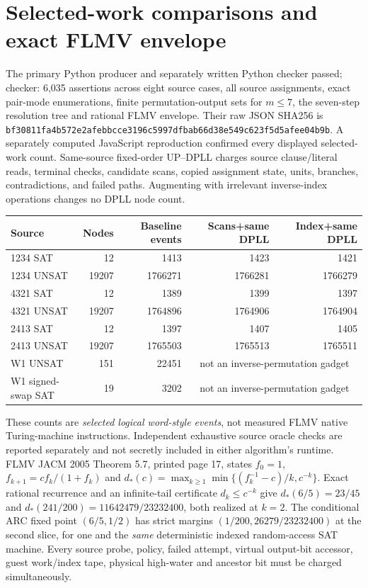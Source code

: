 \documentclass[10pt]{article}
\begin{document}
\section{Selected-work comparisons and exact FLMV envelope}
The primary Python producer and separately written Python checker passed; checker: 6,035 assertions across eight source cases, all source assignments, exact pair-mode enumerations, finite permutation-output sets for $m\le7$, the seven-step resolution tree and rational FLMV envelope. Their raw JSON SHA256 is \texttt{bf30811fa4b572e2afebbcce3196c5997dfbab66d38e549c623f5d5afee04b9b}. A separately computed JavaScript reproduction confirmed every displayed selected-work count. Same-source fixed-order UP--DPLL charges source clause/literal reads, terminal checks, candidate scans, copied assignment state, units, branches, contradictions, and failed paths. Augmenting with irrelevant inverse-index operations changes no DPLL node count.
\begin{center}\small\begin{tabular}{lrrrr}\toprule
Source & Nodes & Baseline events & Scans+same DPLL & Index+same DPLL\\\midrule
1234 SAT&12&1413&1423&1421\\
1234 UNSAT&19207&1766271&1766281&1766279\\
4321 SAT&12&1389&1399&1397\\
4321 UNSAT&19207&1764896&1764906&1764904\\
2413 SAT&12&1397&1407&1405\\
2413 UNSAT&19207&1765503&1765513&1765511\\
W1 UNSAT&151&22451&\multicolumn{2}{c}{not an inverse-permutation gadget}\\
W1 signed-swap SAT&19&3202&\multicolumn{2}{c}{not an inverse-permutation gadget}\\\bottomrule\end{tabular}\end{center}
These counts are \emph{selected logical word-style events}, not measured FLMV native Turing-machine instructions. Independent exhaustive source oracle checks are reported separately and not secretly included in either algorithm's runtime.
FLMV JACM 2005 Theorem 5.7, printed page 17, states $f_0=1$, $f_{k+1}=cf_k/(1+f_k)$ and $d_*(c)=\max_{k\ge1}\min\{(f_k^{-1}-c)/k,c^{-k}\}$. Exact rational recurrence and an infinite-tail certificate $d_k\le c^{-k}$ give $d_*(6/5)=23/45$ and $d_*(241/200)=11642479/23232400$, both realized at $k=2$. The conditional ARC fixed point $(6/5,1/2)$ has strict margins $(1/200,26279/23232400)$ at the second slice, for one and the \emph{same} deterministic indexed random-access SAT machine. Every source probe, policy, failed attempt, virtual output-bit accessor, guest work/index tape, physical high-water and ancestor bit must be charged simultaneously.
\end{document}
